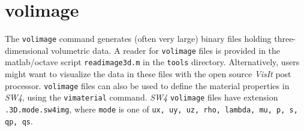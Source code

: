 \documentclass[11pt]{report}
\begin{document}
\section{volimage}\label{sec:volimage-format}

The \verb+volimage+ command generates (often very large) binary files holding three-dimensional
volumetric data. A reader for \verb+volimage+ files is provided in the matlab/octave script
\verb+readimage3d.m+ in the \verb+tools+ directory.  Alternatively, users might want to visualize
the data in these files with the open source {\em VisIt} post processor. \verb+volimage+ files can
also be used to define the material properties in \emph{SW4}, using the \verb+vimaterial+
command. \emph{SW4} \verb+volimage+ files have extension \verb+.3D.mode.sw4img+, where \verb+mode+ is one
of \verb+ux, uy, uz, rho, lambda, mu, p, s, qp, qs+.
\end{document}
